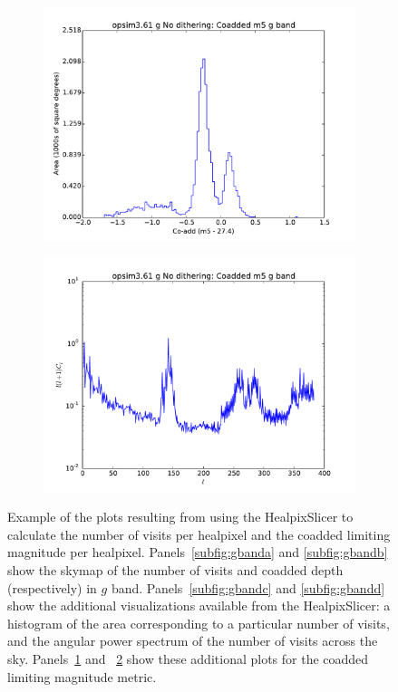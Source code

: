\documentclass[]{spie}  %
\begin{document}
\begin{figure}
\begin{center}
\begin{subfigure}[]{0.2\textwidth}
\includegraphics[width=\textwidth]{figures/opsim3_61_Coadded_m5_g_band_g_No_dithering_HEAL_Histogram}
\caption{}
\label{subfig:gbande}
\end{subfigure}
\begin{subfigure}[]{0.2\textwidth}
\includegraphics[width=\textwidth]{figures/opsim3_61_Coadded_m5_g_band_g_No_dithering_HEAL_PowerSpectrum}
\caption{}
\label{subfig:gbandf}
\end{subfigure}
\end{center}
\caption[]
{ \label{fig:gband}
Example of the plots resulting from using the HealpixSlicer to calculate the number of visits per
healpixel and the coadded limiting magnitude per
healpixel. Panels~\ref{subfig:gbanda} and \ref{subfig:gbandb} show the
skymap of the number of visits and coadded depth (respectively) in $g$
band. Panels~\ref{subfig:gbandc} and \ref{subfig:gbandd} show the additional
visualizations available from the HealpixSlicer: a histogram of the
area corresponding to a particular number of visits, and the angular
power spectrum of the number of visits across the
sky. Panels~\ref{subfig:gbande} and ~\ref{subfig:gbandf} show these
additional plots for the coadded limiting magnitude metric. 
}
\end{figure}
\end{document}
